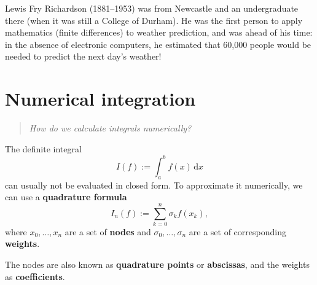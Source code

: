 \documentclass[
  letterpaper,
  DIV=11,
  numbers=noendperiod]{scrreprt}
\begin{document}
\begin{tcolorbox}[enhanced jigsaw, opacityback=0, breakable, title=\textcolor{quarto-callout-note-color}{\faInfo}\hspace{0.5em}{Note}, arc=.35mm, coltitle=black, opacitybacktitle=0.6, bottomrule=.15mm, leftrule=.75mm, left=2mm, colbacktitle=quarto-callout-note-color!10!white, titlerule=0mm, toptitle=1mm, bottomtitle=1mm, colframe=quarto-callout-note-color-frame, rightrule=.15mm, colback=white, toprule=.15mm]

Lewis Fry Richardson (1881--1953) was from Newcastle and an
undergraduate there (when it was still a College of Durham). He was the
first person to apply mathematics (finite differences) to weather
prediction, and was ahead of his time: in the absence of electronic
computers, he estimated that 60,000 people would be needed to predict
the next day's weather!

\end{tcolorbox}

\section{Numerical integration}\label{s-int}

\begin{quote}
\emph{How do we calculate integrals numerically?}
\end{quote}

The definite integral \[
I(f) := \int_a^b f(x)\,\mathrm{d}x
\] can usually not be evaluated in closed form. To approximate it
numerically, we can use a \textbf{quadrature formula} \[
I_n(f) := \sum_{k=0}^n \sigma_k f(x_k),
\] where \(x_0,\ldots,x_n\) are a set of \textbf{nodes} and
\(\sigma_0,\ldots,\sigma_n\) are a set of corresponding
\textbf{weights}.

\begin{tcolorbox}[enhanced jigsaw, opacityback=0, breakable, title=\textcolor{quarto-callout-note-color}{\faInfo}\hspace{0.5em}{Note}, arc=.35mm, coltitle=black, opacitybacktitle=0.6, bottomrule=.15mm, leftrule=.75mm, left=2mm, colbacktitle=quarto-callout-note-color!10!white, titlerule=0mm, toptitle=1mm, bottomtitle=1mm, colframe=quarto-callout-note-color-frame, rightrule=.15mm, colback=white, toprule=.15mm]

The nodes are also known as \textbf{quadrature points} or
\textbf{abscissas}, and the weights as \textbf{coefficients}.

\end{tcolorbox}
\end{document}
